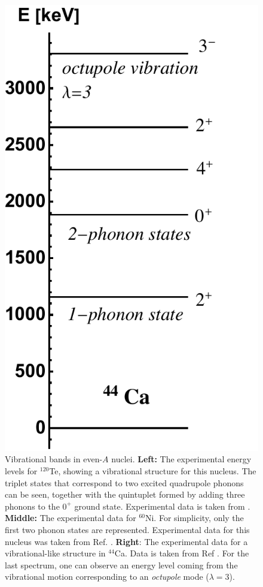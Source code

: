 \begin{figure}
    \includegraphics[scale=0.55]{Chapters/Figures/44Ca_vib_experimental.pdf}
    \caption{Vibrational bands in even-$A$ nuclei. \textbf{Left:} The experimental energy levels for $^{120}$Te, showing a vibrational structure for this nucleus. The triplet states that correspond to two excited quadrupole phonons can be seen, together with the quintuplet formed by adding three phonons to the $0^+$ ground state. Experimental data is taken from \cite{kitao2002nuclear}. \textbf{Middle:} The experimental data for $^{60}$Ni. For simplicity, only the first two phonon states are represented. Experimental data for this nucleus was taken from Ref. \cite{browne2013nuclear}. \textbf{Right}: The experimental data for a vibrational-like structure in $^{44}$Ca. Data is taken from Ref \cite{chen2011nuclear}. For the last spectrum, one can observe an energy level coming from the vibrational motion corresponding to an \emph{octupole} mode ($\lambda=3$).}
    \label{energy-levels-120Te-virbational-band}    
\end{figure}

